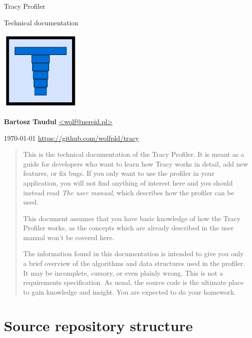 \documentclass[hidelinks,titlepage,a4paper]{article}
\begin{document}
\begin{titlepage}
\centering
{\fontsize{120}{140}\selectfont Tracy Profiler}

\vspace{50pt} {\Huge{}\selectfont Technical documentation}

\vfill \includegraphics[height=40mm]{../icon/icon}

\vfill
\large\textbf{Bartosz Taudul} \href{mailto:wolf@nereid.pl}{<wolf@nereid.pl>}

\vspace{10pt}
\today
\vfill
\url{https://github.com/wolfpld/tracy}
\end{titlepage}

\begin{abstract}
This is the technical documentation of the Tracy Profiler. It is meant as a guide for developers who want to learn how Tracy works in detail, add new features, or fix bugs. If you only want to use the profiler in your application, you will not find anything of interest here and you should instead read \emph{The user manual}, which describes how the profiler can be used.

This document assumes that you have basic knowledge of how the Tracy Profiler works, as the concepts which are already described in the user manual won't be covered here.

The information found in this documentation is intended to give you only a brief overview of the algorithms and data structures used in the profiler. It may be incomplete, cursory, or even plainly wrong. This is not a requirements specification. As usual, the source code is the ultimate place to gain knowledge and insight. You are expected to do your homework.
\end{abstract}

\tableofcontents

\newpage

\section{Source repository structure}
\end{document}
